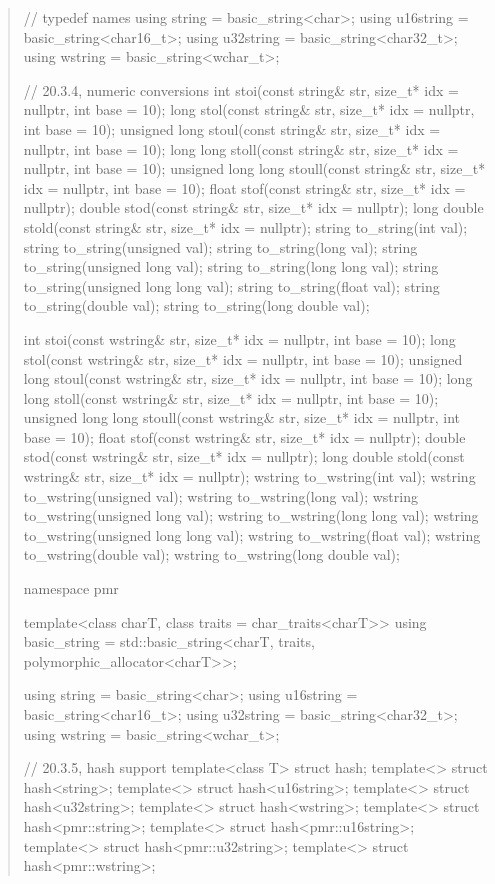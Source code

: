 \documentclass{wg21}
\begin{document}
\begin{quote}
\begin{codeblock}
{  //  typedef names
  using string    = basic_string<char>;
  using u16string = basic_string<char16_t>;
  using u32string = basic_string<char32_t>;
  using wstring   = basic_string<wchar_t>;

  // 20.3.4, numeric conversions
  int stoi(const string& str, size_t* idx = nullptr, int base = 10);
  long stol(const string& str, size_t* idx = nullptr, int base = 10);
  unsigned long stoul(const string& str, size_t* idx = nullptr, int base = 10);
  long long stoll(const string& str, size_t* idx = nullptr, int base = 10);
  unsigned long long stoull(const string& str, size_t* idx = nullptr, int base = 10);
  float stof(const string& str, size_t* idx = nullptr);
  double stod(const string& str, size_t* idx = nullptr);
  long double stold(const string& str, size_t* idx = nullptr);
  string to_string(int val);
  string to_string(unsigned val);
  string to_string(long val);
  string to_string(unsigned long val);
  string to_string(long long val);
  string to_string(unsigned long long val);
  string to_string(float val);
  string to_string(double val);
  string to_string(long double val);

  int stoi(const wstring& str, size_t* idx = nullptr, int base = 10);
  long stol(const wstring& str, size_t* idx = nullptr, int base = 10);
  unsigned long stoul(const wstring& str, size_t* idx = nullptr, int base = 10);
  long long stoll(const wstring& str, size_t* idx = nullptr, int base = 10);
  unsigned long long stoull(const wstring& str, size_t* idx = nullptr, int base = 10);
  float stof(const wstring& str, size_t* idx = nullptr);
  double stod(const wstring& str, size_t* idx = nullptr);
  long double stold(const wstring& str, size_t* idx = nullptr);
  wstring to_wstring(int val);
  wstring to_wstring(unsigned val);
  wstring to_wstring(long val);
  wstring to_wstring(unsigned long val);
  wstring to_wstring(long long val);
  wstring to_wstring(unsigned long long val);
  wstring to_wstring(float val);
  wstring to_wstring(double val);
  wstring to_wstring(long double val);

  namespace pmr {
    template<class charT, class traits = char_traits<charT>>
      using basic_string = std::basic_string<charT, traits, polymorphic_allocator<charT>>;

    using string    = basic_string<char>;
    using u16string = basic_string<char16_t>;
    using u32string = basic_string<char32_t>;
    using wstring   = basic_string<wchar_t>;
  }

  // 20.3.5, hash support
  template<class T> struct hash;
  template<> struct hash<string>;
  template<> struct hash<u16string>;
  template<> struct hash<u32string>;
  template<> struct hash<wstring>;
  template<> struct hash<pmr::string>;
  template<> struct hash<pmr::u16string>;
  template<> struct hash<pmr::u32string>;
  template<> struct hash<pmr::wstring>;

}
\end{codeblock}
\end{quote}
\end{document}
